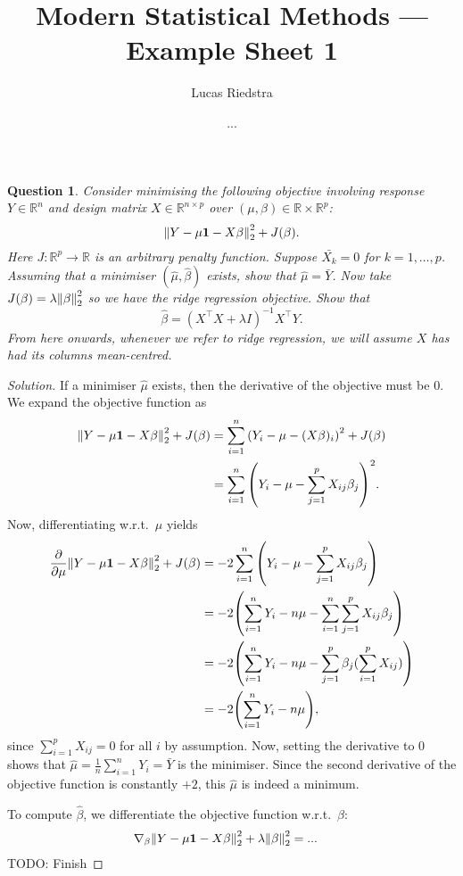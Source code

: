 \documentclass{article}
\title{Modern Statistical Methods --- Example Sheet 1} %
\author{Lucas Riedstra}
\date{...} %
\theoremstyle{plain}
\newtheorem{question}{Question}
\theoremstyle{remark}
\newenvironment{qbox}{\begin{mdframed}\begin{question}}{\end{question}\end{mdframed}}
\newenvironment{solution}{\begin{proof}[Solution]\renewcommand\qedsymbol{}}{\end{proof}}
\renewcommand{\vec}{\mathbf}
\newcommand{\Bb}{\mathbb}
\newcommand{\Bf}{\mathbf}
\newcommand{\RR}{\Bb R}
\newcommand{\T}{^\top} %
\newcommand\TODO{{\color{red} TODO: }}
\begin{document}
\maketitle

\begin{qbox}
    Consider minimising the following objective involving response $Y \in \RR^n$ and design matrix $X \in \RR^{n \times p}$ over $(\mu, \beta) \in \RR \times \RR^p$: 
    \[
    \norm{Y - \mu \Bf{1} - X\beta}_2^2 + J(\beta).
    \]
    Here $J \colon \RR^p \to \RR$ is an arbitrary penalty function. Suppose $\bar{X_k} = 0$ for $k = 1, \dotsc, p$. Assuming that a minimiser $(\hat\mu, \hat\beta)$ exists, show that $\hat\mu = \bar Y$. Now take $J(\beta) = \lambda \norm{\beta}_2^2$ so we have the ridge regression objective. Show that
    \[
    \hat\beta = (X\T X + \lambda I)^{-1} X\T Y.
    \] 
    From here onwards, whenever we refer to ridge regression, we will assume $X$ has had its columns mean-centred. 
\end{qbox}

\begin{solution}
    If a minimiser $\hat\mu$ exists, then the derivative of the objective must be 0. We expand the objective function as
    \begin{align*}
    \norm{Y - \mu\Bf{1} - X\beta}_2^2 + J(\beta) &= \sum_{i=1}^n \qty(Y_i - \mu - (X\beta)_i)^2 + J(\beta) \\
    &= \sum_{i=1}^n \qty(Y_i - \mu - \sum_{j=1}^p X_{ij}\beta_j)^2. 
    \end{align*}
Now, differentiating w.r.t.\ $\mu$ yields
\begin{align*}
\pdv{\mu} \norm{Y - \mu\Bf{1} - X\beta}_2^2 + J(\beta) &= -2 \sum_{i=1}^n \qty( Y_i - \mu - \sum_{j=1}^p X_{ij}\beta_j) \\
&= -2 \qty(\sum_{i=1}^n Y_i  - n\mu - \sum_{i=1}^n \sum_{j=1}^p X_{ij}\beta_j) \\
&= -2 \qty(\sum_{i=1}^n Y_i  - n\mu - \sum_{j=1}^p \beta_j (\sum_{i=1}^p X_{ij})) \\
&= -2 \qty( \sum_{i=1}^n Y_i - n\mu), 
\end{align*}
since $\sum_{i=1}^p X_{ij} = 0$ for all $i$ by assumption. Now, setting the derivative to 0 shows that $\hat\mu = \frac1n \sum_{i=1}^n Y_i = \bar Y$ is the minimiser. Since the second derivative of the objective function is constantly $+2$, this $\hat\mu$ is indeed a minimum. 

To compute $\hat\beta$, we differentiate the objective function w.r.t.\ $\beta$: 
\begin{align*}
    \nabla_\beta \norm{Y- \mu \vec 1 - X\beta}_2^2 + \lambda \norm{\beta}_2^2 &= ...
\end{align*}
\TODO Finish
\end{solution}
\end{document}
